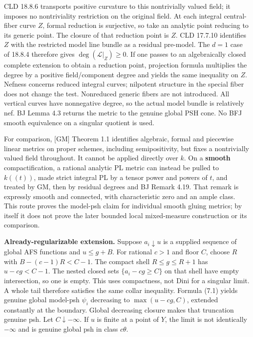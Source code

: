 \documentclass[
  10pt,
]{article}
\begin{document}
CLD 18.8.6 transports positive curvature to this nontrivially valued
field; it imposes no nontriviality restriction on the original field. At
each integral central-fiber curve \(Z\), formal reduction is surjective,
so take an analytic point reducing to its generic point. The closure of
that reduction point is \(Z\). CLD 17.7.10 identifies \(Z\) with the
restricted model line bundle as a residual pre-model. The \(d=1\) case
of 18.8.4 therefore gives \(\deg(\mathcal L|_Z)\ge0\). If one passes to
an algebraically closed complete extension to obtain a reduction point,
projection formula multiplies the degree by a positive field/component
degree and yields the same inequality on \(Z\). Nefness concerns reduced
integral curves; nilpotent structure in the special fiber does not
change the test. Nonreduced generic fibers are not introduced. All
vertical curves have nonnegative degree, so the actual model bundle is
relatively nef. BJ Lemma 4.3 returns the metric to the genuine global
PSH cone. No BFJ smooth equivalence on a singular quotient is used.

For comparison, {[}GM{]} Theorem 1.1 identifies algebraic, formal and
piecewise linear metrics on proper schemes, including semipositivity,
but fixes a nontrivially valued field throughout. It cannot be applied
directly over \(k\). On a \textbf{smooth} compactification, a rational
analytic PL metric can instead be pulled to \(k((t))\), made strict
integral PL by a tensor power and powers of \(t\), and treated by GM,
then by residual degrees and BJ Remark 4.19. That remark is expressly
smooth and connected, with characteristic zero and an ample class. This
route proves the model-psh claim for individual smooth gluing metrics;
by itself it does not prove the later bounded local mixed-measure
construction or its comparison.

\textbf{Already-regularizable extension.} Suppose \(a_i\downarrow u\) is
a supplied sequence of global AFS functions and \(u\le g+B\). For
rational \(c>1\) and floor \(C\), choose \(R\) with \(B-(c-1)R<C-1\).
The compact shell \(R\le g\le R+1\) has \(u-cg<C-1\). The nested closed
sets \(\{a_i-cg\ge C\}\) on that shell have empty intersection, so one
is empty. This uses compactness, not Dini for a singular limit. A whole
tail therefore satisfies the same collar inequality. Formula (7.1)
yields genuine global model-psh \(\psi_i\) decreasing to
\(\max(u-cg,C)\), extended constantly at the boundary. Global decreasing
closure makes that truncation genuine psh. Let \(C\downarrow-\infty\).
If \(u\) is finite at a point of \(Y\), the limit is not identically
\(-\infty\) and is genuine global psh in class \(c\theta\).
\end{document}
